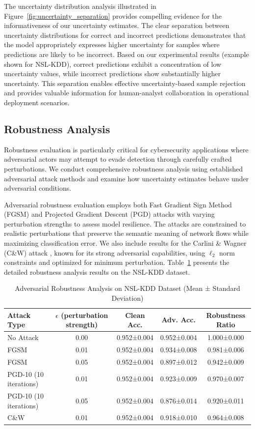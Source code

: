 \documentclass[journal]{IEEEtran}
\begin{document}
The uncertainty distribution analysis illustrated in Figure~\ref{fig:uncertainty_separation} provides compelling evidence for the informativeness of our uncertainty estimates. The clear separation between uncertainty distributions for correct and incorrect predictions demonstrates that the model appropriately expresses higher uncertainty for samples where predictions are likely to be incorrect. Based on our experimental results (example shown for NSL-KDD), correct predictions exhibit a concentration of low uncertainty values, while incorrect predictions show substantially higher uncertainty. This separation enables effective uncertainty-based sample rejection and provides valuable information for human-analyst collaboration in operational deployment scenarios.

\subsection{Robustness Analysis}

Robustness evaluation is particularly critical for cybersecurity applications where adversarial actors may attempt to evade detection through carefully crafted perturbations. We conduct comprehensive robustness analysis using established adversarial attack methods and examine how uncertainty estimates behave under adversarial conditions.

Adversarial robustness evaluation employs both Fast Gradient Sign Method (FGSM) and Projected Gradient Descent (PGD) attacks with varying perturbation strengths to assess model resilience. The attacks are constrained to realistic perturbations that preserve the semantic meaning of network flows while maximizing classification error. We also include results for the Carlini \& Wagner (C\&W) attack \cite{carlini2017towards}, known for its strong adversarial capabilities, using $\ell_2$ norm constraints and optimized for minimum perturbation. Table~\ref{tab:adversarial} presents the detailed robustness analysis results on the NSL-KDD dataset.

\begin{table}[t]
\centering
\caption{Adversarial Robustness Analysis on NSL-KDD Dataset (Mean ± Standard Deviation)}
\label{tab:adversarial}
\begin{tabular}{@{}lcccc@{}}
\toprule
\textbf{Attack Type} & \textbf{$\epsilon$ (perturbation strength)} & \textbf{Clean Acc.} & \textbf{Adv. Acc.} & \textbf{Robustness Ratio} \\
\midrule
No Attack & 0.00 & 0.952±0.004 & 0.952±0.004 & 1.000±0.000 \\
FGSM & 0.01 & 0.952±0.004 & 0.934±0.008 & 0.981±0.006 \\
FGSM & 0.05 & 0.952±0.004 & 0.897±0.012 & 0.942±0.009 \\
PGD-10 (10 iterations) & 0.01 & 0.952±0.004 & 0.923±0.009 & 0.970±0.007 \\
PGD-10 (10 iterations) & 0.05 & 0.952±0.004 & 0.876±0.014 & 0.920±0.011 \\
C\&W & 0.01 & 0.952±0.004 & 0.918±0.010 & 0.964±0.008 \\
\bottomrule
\end{tabular}
\end{table}
\end{document}
